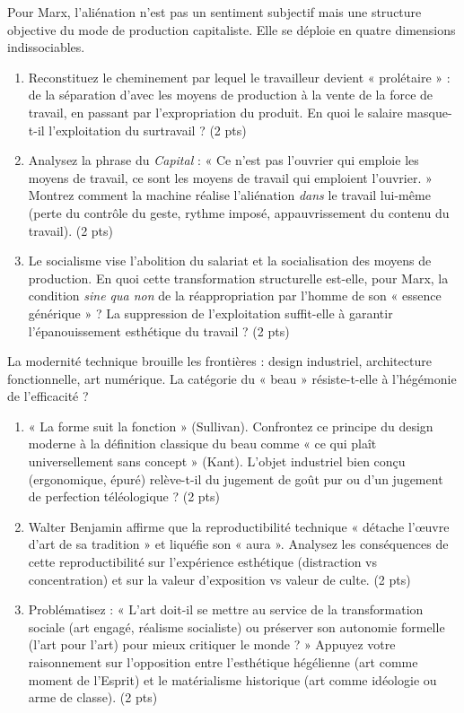 \documentclass[11pt]{article}
\begin{document}
\begin{exercice}
Pour Marx, l'aliénation n'est pas un sentiment subjectif mais une structure objective du mode de production capitaliste. Elle se déploie en quatre dimensions indissociables.

\begin{enumerate}
    \item Reconstituez le cheminement par lequel le travailleur devient « prolétaire » : de la séparation d'avec les moyens de production à la vente de la force de travail, en passant par l'expropriation du produit. En quoi le salaire masque-t-il l'exploitation du surtravail ? (2 pts)
    \item Analysez la phrase du \textit{Capital} : « Ce n'est pas l'ouvrier qui emploie les moyens de travail, ce sont les moyens de travail qui emploient l'ouvrier. » Montrez comment la machine réalise l'aliénation \textit{dans} le travail lui-même (perte du contrôle du geste, rythme imposé, appauvrissement du contenu du travail). (2 pts)
    \item Le socialisme vise l'abolition du salariat et la socialisation des moyens de production. En quoi cette transformation structurelle est-elle, pour Marx, la condition \textit{sine qua non} de la réappropriation par l'homme de son « essence générique » ? La suppression de l'exploitation suffit-elle à garantir l'épanouissement esthétique du travail ? (2 pts)
\end{enumerate}
\end{exercice}

\begin{exercice}
La modernité technique brouille les frontières : design industriel, architecture fonctionnelle, art numérique. La catégorie du « beau » résiste-t-elle à l'hégémonie de l'efficacité ?

\begin{enumerate}
    \item « La forme suit la fonction » (Sullivan). Confrontez ce principe du design moderne à la définition classique du beau comme « ce qui plaît universellement sans concept » (Kant). L'objet industriel bien conçu (ergonomique, épuré) relève-t-il du jugement de goût pur ou d'un jugement de perfection téléologique ? (2 pts)
    \item Walter Benjamin affirme que la reproductibilité technique « détache l'œuvre d'art de sa tradition » et liquéfie son « aura ». Analysez les conséquences de cette reproductibilité sur l'expérience esthétique (distraction vs concentration) et sur la valeur d'exposition vs valeur de culte. (2 pts)
    \item Problématisez : « L'art doit-il se mettre au service de la transformation sociale (art engagé, réalisme socialiste) ou préserver son autonomie formelle (l'art pour l'art) pour mieux critiquer le monde ? » Appuyez votre raisonnement sur l'opposition entre l'esthétique hégélienne (art comme moment de l'Esprit) et le matérialisme historique (art comme idéologie ou arme de classe). (2 pts)
\end{enumerate}
\end{exercice}
\end{document}
